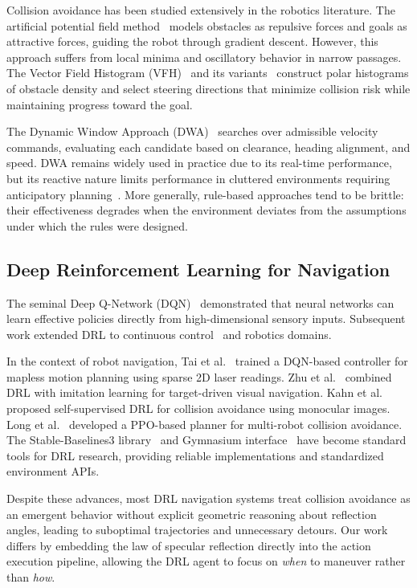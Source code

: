 \documentclass[conference]{IEEEtran}
\begin{document}
Collision avoidance has been studied extensively in the robotics literature. The artificial potential field method~\cite{khatib1986real} models obstacles as repulsive forces and goals as attractive forces, guiding the robot through gradient descent. However, this approach suffers from local minima and oscillatory behavior in narrow passages. The Vector Field Histogram (VFH)~\cite{borenstein1991vector} and its variants~\cite{ulrich2000vfh} construct polar histograms of obstacle density and select steering directions that minimize collision risk while maintaining progress toward the goal.

The Dynamic Window Approach (DWA)~\cite{fox1997dynamic} searches over admissible velocity commands, evaluating each candidate based on clearance, heading alignment, and speed. DWA remains widely used in practice due to its real-time performance, but its reactive nature limits performance in cluttered environments requiring anticipatory planning~\cite{lavalle2006planning}. More generally, rule-based approaches tend to be brittle: their effectiveness degrades when the environment deviates from the assumptions under which the rules were designed.

\subsection{Deep Reinforcement Learning for Navigation}

The seminal Deep Q-Network (DQN)~\cite{mnih2015human} demonstrated that neural networks can learn effective policies directly from high-dimensional sensory inputs. Subsequent work extended DRL to continuous control~\cite{lillicrap2015continuous, schulman2017proximal} and robotics domains.

In the context of robot navigation, Tai et al.~\cite{tai2017virtual} trained a DQN-based controller for mapless motion planning using sparse 2D laser readings. Zhu et al.~\cite{zhu2017target} combined DRL with imitation learning for target-driven visual navigation. Kahn et al.~\cite{kahn2017self} proposed self-supervised DRL for collision avoidance using monocular images. Long et al.~\cite{long2018towards} developed a PPO-based planner for multi-robot collision avoidance. The Stable-Baselines3 library~\cite{raffin2021stable} and Gymnasium interface~\cite{towers2023gymnasium} have become standard tools for DRL research, providing reliable implementations and standardized environment APIs.

Despite these advances, most DRL navigation systems treat collision avoidance as an emergent behavior without explicit geometric reasoning about reflection angles, leading to suboptimal trajectories and unnecessary detours. Our work differs by embedding the law of specular reflection directly into the action execution pipeline, allowing the DRL agent to focus on \emph{when} to maneuver rather than \emph{how}.
\end{document}
